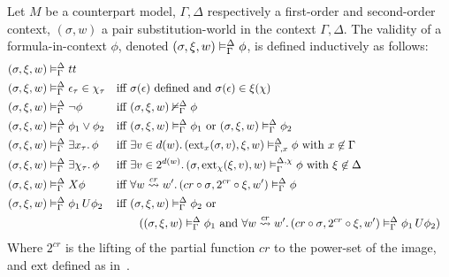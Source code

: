\begin{definition}
Let $M$ be a counterpart model, $\Gamma,\Delta$ respectively a first-order and second-order context, $(\sigma, w)$ a
pair substitution-world in the context $\Gamma,\Delta$.
The validity of a formula-in-context $\phi$, denoted $({\sigma}, {\xi}, {w}) \vDash_{\Gamma}^{\Delta} {\phi}$, is defined inductively as follows:
\begin{align*}
  (\sigma, \xi, w) &\vDash_\Gamma^\Delta tt \\
  (\sigma, \xi, w) &\vDash_\Gamma^\Delta \epsilon_\tau \in \chi_\tau
      &&\text{iff $\sigma(\epsilon)$ defined and } \sigma(\epsilon) \in \xi(\chi) \\
  (\sigma, \xi, w) &\vDash_\Gamma^\Delta \neg\phi
      &&\text{iff } ({\sigma}, {\xi}, {w}) \nvDash_{\Gamma}^{\Delta} {\phi} \\
  (\sigma, \xi, w) &\vDash_\Gamma^\Delta \phi_1 \lor \phi_2
      &&\text{iff } ({\sigma}, {\xi}, {w}) \vDash_{\Gamma}^{\Delta} {\phi_1} \text{ or }
      ({\sigma}, {\xi}, {w}) \vDash_{\Gamma}^{\Delta} {\phi_2} \\
  (\sigma, \xi, w) &\vDash_\Gamma^\Delta \exists {x_\tau} \ldotp {\phi}
      &&\text{iff } \exists {v \in d(w)} \ldotp {({\text{ext}_{x}({\sigma},{v})}, {\xi}, {w}) \vDash_{\Gamma, x}^{\Delta} {\phi}} \text{ with }
      x \not\in \Gamma \\
  (\sigma, \xi, w) &\vDash_\Gamma^\Delta \exists {\chi_\tau} \ldotp {\phi}
      &&\text{iff } \exists {v \in 2^{d(w)}} \ldotp {({\sigma}, {\text{ext}_{\chi}({\xi},{v})}, {w}) \vDash_{\Gamma}^{\Delta,\chi} {\phi}}
        \text{ with } \xi \not\in \Delta \\
  (\sigma, \xi, w) &\vDash_\Gamma^\Delta X{\phi}
      &&\text{iff } \forall {w \overset{cr}{\rightsquigarrow} w'} \ldotp {({cr \circ \sigma}, {2^{cr} \circ \xi}, {w'}) \vDash_{\Gamma}^{\Delta} {\phi}} \\
 (\sigma, \xi, w) &\vDash_\Gamma^\Delta {\phi_1}\,U {\phi_2}
     &&\text{iff } ({\sigma}, {\xi}, {w}) \vDash_{\Gamma}^{\Delta} {\phi_2} \text{ or } \\
     &&&\qquad(({\sigma}, {\xi}, {w}) \vDash_{\Gamma}^{\Delta} {\phi_1}
         \text { and } \forall {w \overset{cr}{\rightsquigarrow} w'} \ldotp {({cr \circ \sigma}, {2^{cr} \circ \xi}, {w'}) \vDash_{\Gamma}^{\Delta} {{\phi_1}\,U {\phi_2}}}) \\
\end{align*}
  Where $2^{cr}$ is the lifting of the partial function $cr$ to the power-set of the image, and $\text{ext}$ defined as
  in~.
\end{definition}
